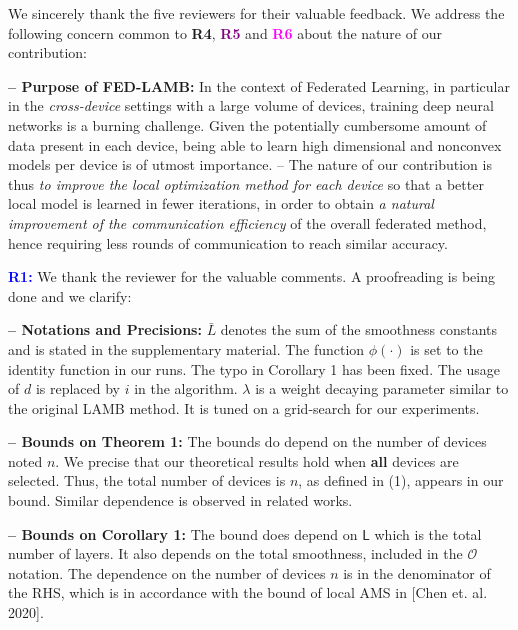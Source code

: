 \documentclass{article}
\begin{document}
We sincerely thank the five reviewers for their valuable feedback. 
We address the following concern common to \textbf{\textcolor{green!50!black}{R4}}, \textbf{\textcolor{purple}{R5}} and \textbf{\textcolor{magenta}{R6}} about the nature of our contribution:\vspace{-3pt}

\textbf{-- Purpose of FED-LAMB:} 
In the context of Federated Learning, in particular in the \emph{cross-device} settings with a large volume of devices, training deep neural networks is a burning challenge.
Given the potentially cumbersome amount of data present in each device, being able to learn high dimensional and nonconvex models per device is of utmost importance.
-- The nature of our contribution is thus \emph{to improve the local optimization method for each device} so that a better local model is learned in fewer iterations, in order to obtain \emph{a natural improvement of the communication efficiency} of the overall federated method, hence requiring less rounds of communication to reach similar accuracy.
\vspace{-2pt}

\textbf{\textcolor{blue}{R1:}} We thank the reviewer for the valuable comments. A proofreading is being done and we clarify:\vspace{-3pt}

\textbf{-- Notations and Precisions:} 
$\bar{L}$ denotes the sum of the smoothness constants and is stated in the supplementary material. 
The function $\phi(\cdot)$ is set to the identity function in our runs. 
The typo in Corollary 1 has been fixed.
The usage of $d$ is replaced by $i$ in the algorithm.
$\lambda$ is a weight decaying parameter similar to the original LAMB method. It is tuned on a grid-search for our experiments.

\vspace{-2pt}
\textbf{-- Bounds on Theorem 1:} The bounds do depend on the number of devices noted $n$.
We precise that our theoretical results hold when \textbf{all} devices are selected. 
Thus, the total number of devices is $n$, as defined in (1), appears in our bound.
Similar dependence is observed in related works.
 
 \vspace{-2pt}
\textbf{-- Bounds on Corollary 1:} 
The bound does depend on $\mathsf{L}$ which is the total number of layers. 
It also depends on the total smoothness, included in the $\mathcal{O}$ notation.
The dependence on the number of devices $n$ is in the denominator of the RHS, which is in accordance with the bound of local AMS in [Chen et. al. 2020].
\end{document}
